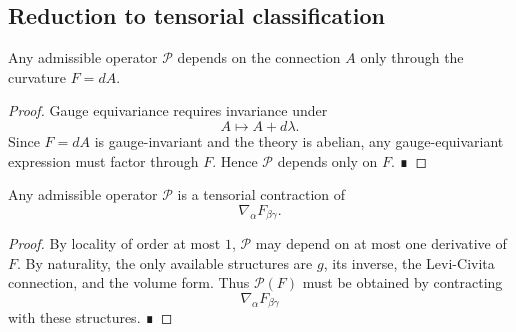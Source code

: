 \subsection{Reduction to tensorial classification}
\begin{lemma}
	\label{lem:em-operator-gauge-reduction}
	Any admissible operator $\mathcal P$ depends on the connection $A$
	only through the curvature $F=dA$.
\end{lemma}
\begin{proof}
	Gauge equivariance requires invariance under
	\[
		A \mapsto A + d\lambda.
	\]
	Since $F=dA$ is gauge-invariant and the theory is abelian, any
	gauge-equivariant expression must factor through $F$.
	Hence $\mathcal P$ depends only on $F$. ∎
\end{proof}
\begin{lemma}
	\label{lem:em-operator-first-order}
	Any admissible operator $\mathcal P$ is a tensorial contraction of
	\[
		\nabla_\alpha F_{\beta\gamma}.
	\]
\end{lemma}
\begin{proof}
	By locality of order at most $1$, $\mathcal P$ may depend on at most
	one derivative of $F$.
	By naturality, the only available structures are $g$, its inverse,
	the Levi-Civita connection, and the volume form.
	Thus $\mathcal P(F)$ must be obtained by contracting
	\[
		\nabla_\alpha F_{\beta\gamma}
	\]
	with these structures. ∎
\end{proof}
